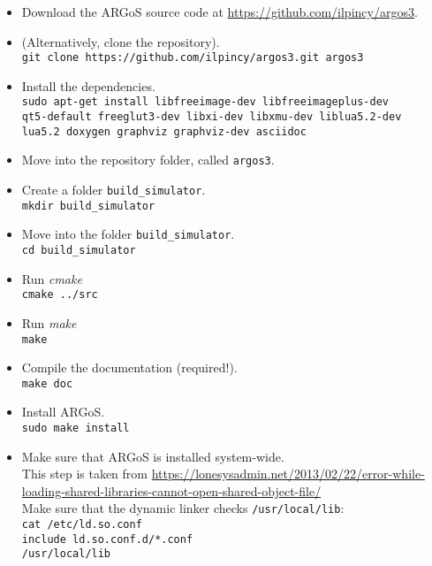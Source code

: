 \documentclass[
12pt,
a4paper,
oneside,
headinclude,
footinclude]{article}
\theoremstyle{definition} %
\begin{document}
\begin{itemize}
    \item Download the ARGoS source code at \href{https://github.com/ilpincy/argos3}{https://github.com/ilpincy/argos3}.
    
    \item (Alternatively, clone the repository).\\
    \-\quad\texttt{git clone https://github.com/ilpincy/argos3.git argos3}
    
    \item Install the dependencies.\\
    \-\quad\texttt{sudo apt-get install libfreeimage-dev libfreeimageplus-dev \ \\
    qt5-default freeglut3-dev libxi-dev libxmu-dev liblua5.2-dev \ \\
    lua5.2 doxygen graphviz graphviz-dev asciidoc}

    \item Move into the repository folder, called \texttt{argos3}.
    
    \item Create a folder \texttt{build\_simulator}.\\
    \-\quad\texttt{mkdir build\_simulator}
    
    \item Move into the folder \texttt{build\_simulator}.\\
    \-\quad\texttt{cd build\_simulator}
    
    \item Run \textit{cmake}\\
    \-\quad\texttt{cmake ../src}
    
    \item Run \textit{make}\\
    \-\quad\texttt{make}
    
    \item Compile the documentation (required!).\\
    \-\quad\texttt{make doc}
    
    \item Install ARGoS.\\
    \-\quad\texttt{sudo make install}
    
    \item Make sure that ARGoS is installed system-wide.\\
    This step is taken from \href{https://lonesysadmin.net/2013/02/22/error-while-loading-shared-libraries-cannot-open-shared-object-file/}{https://lonesysadmin.net/2013/02/22/error-while-loading-shared-libraries-cannot-open-shared-object-file/}\\
    Make sure that the dynamic linker checks \texttt{/usr/local/lib}:\\
    \-\quad\texttt{cat /etc/ld.so.conf}\\
    \-\quad\texttt{include ld.so.conf.d/*.conf}\\
    \-\quad\texttt{/usr/local/lib}
    

\end{itemize}
\end{document}
